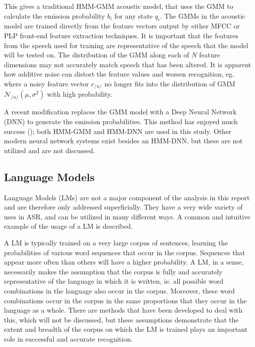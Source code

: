 This gives a traditional HMM-GMM acoustic model, that uses the GMM to calculate the emission probability $b_i$ for any state $q_i$.  The GMMs in the acoustic model are trained directly from the feature vectors output by either MFCC or PLP front-end feature extraction techniques.  It is important that the features from the speech used for training are representative of the speech that the model will be tested on.  The distribution of the GMM along each of $N$ feature dimensions may not accurately match speech that has been altered.  It is apparent how additive noise can distort the feature values and worsen recognition, eg. where a noisy feature vector $c_{/u/}$ no longer fits into the distribution of GMM $\mathcal{N}_{/u/}(\mu,\sigma^2)$ with high probability.

A recent modification replaces the GMM model with a Deep Neural Network (DNN) to generate the emission probabilities. This method has enjoyed much success (\cite{zhang:17}); both HMM-GMM and HMM-DNN are used in this study.  Other modern neural network systems exist besides an HMM-DNN, but these are not utilized and are not discussed.





\DIFdelbegin \subsubsection{}
\addtocounter{subsubsection}{-1}%
\DIFdelend \DIFaddbegin \subsection{Language Models}\label{sec:lang-mod}
\DIFaddend 

Language Models (LMs) are not a major component of the analysis in this report and are therefore only addressed superficially.  They have a very wide variety of uses in ASR, and can be utilized in many different ways.  A common and intuitive example of the usage of a LM is described.

A LM is typically trained on a very large corpus of sentences, learning the probabilities of various word sequences that occur in the corpus.  Sequences that appear more often than others will have a higher probability.  A LM, in a sense, necessarily makes the assumption that the corpus is fully and accurately representative of the language in which it is written, ie. all possible word combinations in the language also occur in the corpus. Moreover, these word combinations occur in the corpus in the same proportions that they occur in the language as a whole.  There are methods that have been developed to deal with this, which will not be discussed, but these assumptions demonstrate that the extent and breadth of the corpus on which the LM is trained plays an important role in successful and accurate recognition.  


